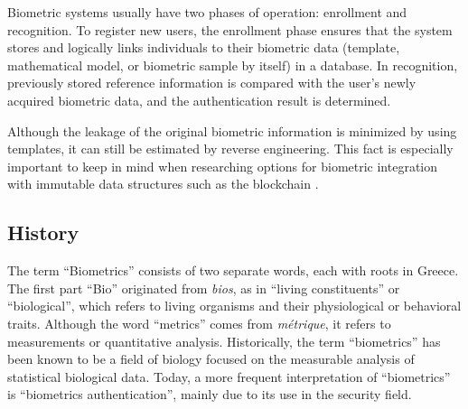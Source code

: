 \label{BiometricTypicalProcesses}
Biometric systems usually have two phases of operation: enrollment and recognition\cite{BiometricAuthentication}. To register new users, the enrollment phase ensures that the system stores and logically links individuals to their biometric data (template, mathematical model, or biometric sample by itself) in a database. In recognition, previously stored reference information is compared with the user's newly acquired biometric data, and the authentication result is determined.

Although the leakage of the original biometric information is minimized by using templates, it can still be estimated by reverse engineering\cite{BiometricTemplateSecurity}. This fact is especially important to keep in mind when researching options for biometric integration with immutable data structures such as the blockchain \cite{BiometricsOnBlockchain}.


\subsection{History}
The term ``Biometrics'' consists of two separate words, each with roots in Greece. The first part ``Bio'' originated from \emph{bios}, as in ``living constituents'' or ``biological'', which refers to living organisms and their physiological or behavioral traits. Although the word ``metrics'' comes from \emph{métrique}, it refers to measurements or quantitative analysis. Historically, the term ``biometrics'' has been known to be a field of biology focused on the measurable analysis of statistical biological data. Today, a more frequent interpretation of ``biometrics'' is ``biometrics authentication''\cite{wayman2005biometric}, mainly due to its use in the security field. 

